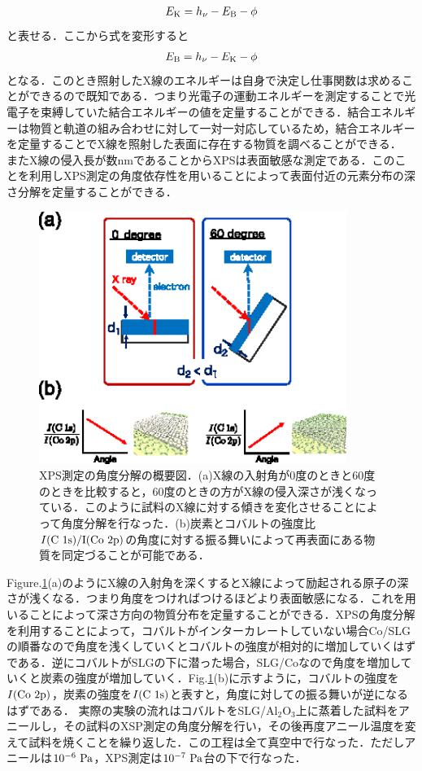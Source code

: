 {\begin{eqnarray}
E_{\rm K} = h_{\rm\nu} - E_{\rm B} -\phi
\label{eq:XPS1}
\end{eqnarray}
と表せる．ここから式を変形すると
\begin{eqnarray}
E_{\rm B} = h_{\rm\nu} - E_{\rm K} -\phi
\label{eq:XPS2}
\end{eqnarray}
となる．このとき照射したX線のエネルギーは自身で決定し仕事関数は求めることができるので既知である．つまり光電子の運動エネルギーを測定することで光電子を束縛していた結合エネルギーの値を定量することができる．結合エネルギーは物質と軌道の組み合わせに対して一対一対応しているため，結合エネルギーを定量することでX線を照射した表面に存在する物質を調べることができる．
またX線の侵入長が数nmであることからXPSは表面敏感な測定である．このことを利用しXPS測定の角度依存性を用いることによって表面付近の元素分布の深さ分解を定量することができる．
\begin{figure}[htbp]
\centerline{
\includegraphics[width=10cm]{images/XPSAng_concept.eps}
}
\caption{XPS測定の角度分解の概要図．(a)X線の入射角が0度のときと60度のときを比較すると，60度のときの方がX線の侵入深さが浅くなっている．このように試料のX線に対する傾きを変化させることによって角度分解を行なった．(b)炭素とコバルトの強度比$I(\rm C\ 1s)/I(\rm Co\ 2p)$の角度に対する振る舞いによって再表面にある物質を同定づることが可能である．
}
\label{fig:XPSAng_concept} 
\end{figure}

Figure.\ref{fig:XPSAng_concept}(a)のようにX線の入射角を深くするとX線によって励起される原子の深さが浅くなる．つまり角度をつければつけるほどより表面敏感になる．これを用いることによって深さ方向の物質分布を定量することができる．XPSの角度分解を利用することによって，コバルトがインターカレートしていない場合Co/SLGの順番なので角度を浅くしていくとコバルトの強度が相対的に増加していくはずである．逆にコバルトがSLGの下に潜った場合，SLG/Coなので角度を増加していくと炭素の強度が増加していく．Fig.\ref{fig:XPSAng_concept}(b)に示すように，コバルトの強度を$I(\rm Co\ 2p)$，炭素の強度を$I(\rm C\ 1s)$と表すと，角度に対しての振る舞いが逆になるはずである．
実際の実験の流れはコバルトをSLG/Al$_{2}$O$_{3}$上に蒸着した試料をアニールし，その試料のXSP測定の角度分解を行い，その後再度アニール温度を変えて試料を焼くことを繰り返した．この工程は全て真空中で行なった．ただしアニールは$10^{-6}\rm\ Pa$，XPS測定は$10^{-7}\rm\ Pa$台の下で行なった．

}
